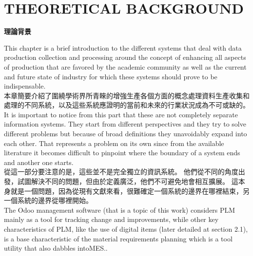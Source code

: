 \chapter{THEORETICAL BACKGROUND} 
\setcounter{page}{3}  %
\begin{center}
\fontsize{18}{16}\selectfont \textbf{理論背景}\\
\end{center}

\fontsize{14pt}{2.5pt}\sectionef 
{This chapter is a brief introduction to the different systems that deal with data production 
collection and processing around the concept of enhancing all aspects of production that are 
favored by the academic community as well as the current and future state of industry for 
which these systems should prove to be indispensable.}\\[1pt]

\fontsize{14pt}{5pt}\sectionef
 {本章簡要介紹了圍繞學術界所青睞的增強生產各個方面的概念處理資料生產收集和處理的不同系統，以及這些系統應證明的當前和未來的行業狀況成為不可或缺的。}\\[15pt]

\fontsize{14pt}{2.5pt}\sectionef 
{It is important to notice from this part that these are not completely separate information 
systems. They start from different perspectives and they try to solve different problems but 
because of broad definitions they unavoidably expand into each other. That represents a 
problem on its own since from the available literature it becomes difficult to pinpoint where 
the boundary of a system ends and another one starts.}\\[1pt]

\fontsize{14pt}{5pt}\sectionef
 {從這一部分要注意的是，這些並不是完全獨立的資訊系統。 他們從不同的角度出發，試圖解決不同的問題，但由於定義廣泛，他們不可避免地會相互擴展。 這本身就是一個問題，因為從現有文獻來看，很難確定一個系統的邊界在哪裡結束，另一個系統的邊界從哪裡開始。}\\[15pt]

\fontsize{14pt}{2.5pt}\sectionef 
{The Odoo management software (that is a topic of this work) considers PLM mainly as a tool for tracking change and improvements, while other key characteristics of PLM, like the use of digital items (later detailed at section 2.1), is a base characteristic of the material requirements planning which is a tool utility that also dabbles intoMES..}\\[1pt]

